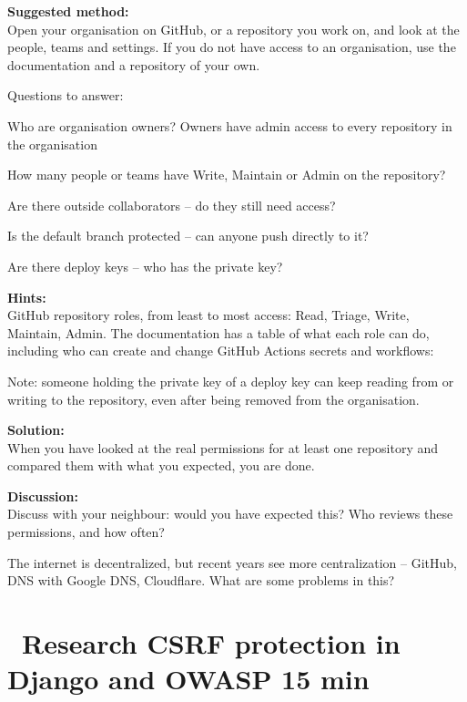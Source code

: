 \documentclass[a4paper,11pt,notitlepage]{report}
\begin{document}
{\bf Suggested method:}\\
Open your organisation on GitHub, or a repository you work on, and look at the people, teams and settings. If you do not have access to an organisation, use the documentation and a repository of your own.

Questions to answer:
\begin{list2}
\item Who are organisation owners? Owners have admin access to every repository in the organisation
\item How many people or teams have Write, Maintain or Admin on the repository?
\item Are there outside collaborators -- do they still need access?
\item Is the default branch protected -- can anyone push directly to it?
\item Are there deploy keys -- who has the private key?
\end{list2}

{\bf Hints:}\\
GitHub repository roles, from least to most access: Read, Triage, Write, Maintain, Admin. The documentation has a table of what each role can do, including who can create and change GitHub Actions secrets and workflows:\\

Note: someone holding the private key of a deploy key can keep reading from or writing to the repository, even after being removed from the organisation.

{\bf Solution:}\\
When you have looked at the real permissions for at least one repository and compared them with what you expected, you are done.

{\bf Discussion:}\\
Discuss with your neighbour: would you have expected this? Who reviews these permissions, and how often?

The internet is decentralized, but recent years see more centralization -- GitHub, DNS with Google DNS, Cloudflare. What are some problems in this?


\chapter{\faExclamationTriangle\ Research CSRF protection in Django and OWASP 15 min}
\label{ex:research-middleware-csrf}
\end{document}
